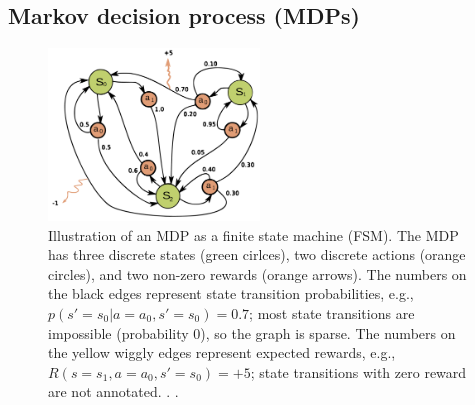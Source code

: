 \subsection{Markov  decision process (MDPs)}
\label{sec:MDP}




\begin{figure}
\centering
    \includegraphics[height=1.8in]{figs/MDPwiki.png}
\caption{
Illustration of an MDP as a finite state machine (FSM).
The MDP has three discrete states (green cirlces),
two discrete
actions (orange circles), and two non-zero rewards (orange arrows).
The numbers on the black
edges represent state transition
probabilities, e.g.,  $p(s'=s_0|a=a_0,s'=s_0)=0.7$;
most state transitions are impossible
(probability 0), so the graph is sparse.
The numbers on the yellow wiggly edges represent
expected rewards, e.g., $R(s=s_1, a=a_0, s'=s_0) = +5$;
state transitions   with zero reward are not annotated.
.
.
}
\label{fig:MDP}
\end{figure}

